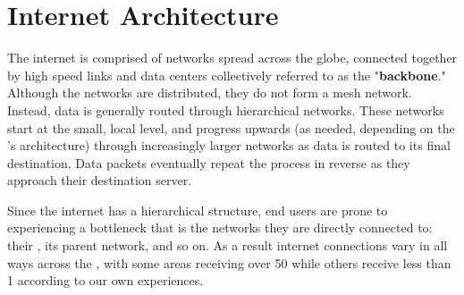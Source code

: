 \section{Internet Architecture}\label{sec:background_internet_architecture}

The internet is comprised of networks spread across the globe, connected together by high speed links and data centers collectively referred to as the "\textbf{backbone}." Although the networks are distributed, they do not form a mesh network. Instead, data is generally routed through hierarchical networks. These networks start at the small, local level, and progress upwards (as needed, depending on the \isp's architecture) through increasingly larger networks as data is routed to its final destination. Data packets eventually repeat the process in reverse as they approach their destination server.

Since the internet has a hierarchical structure, end users are prone to experiencing a bottleneck that is the networks they are directly connected to: their \isp, its parent network, and so on. As a result internet connections vary in all ways across the \us, with some areas receiving over 50 \mbps while others receive less than 1 according to our own experiences.